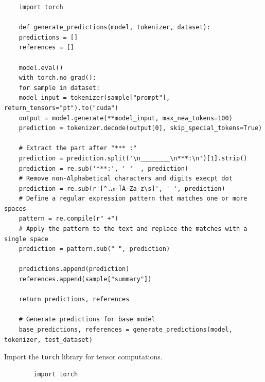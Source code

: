 \documentclass{solutionclass} %
\begin{document}
\begin{lstlisting}
	import torch
	
	def generate_predictions(model, tokenizer, dataset):
	predictions = []
	references = []
	
	model.eval()
	with torch.no_grad():
	for sample in dataset:
	model_input = tokenizer(sample["prompt"], return_tensors="pt").to("cuda")
	output = model.generate(**model_input, max_new_tokens=100)
	prediction = tokenizer.decode(output[0], skip_special_tokens=True)
	
	# Extract the part after "*** :"
	prediction = prediction.split('\n________\n***:\n')[1].strip()
	prediction = re.sub('***:', ' '  , prediction)
	# Remove non-Alphabetical characters and digits execpt dot
	prediction = re.sub(r'[^.آ-یA-Za-z\s]', ' ', prediction)
	# Define a regular expression pattern that matches one or more spaces
	pattern = re.compile(r" +")
	# Apply the pattern to the text and replace the matches with a single space
	prediction = pattern.sub(" ", prediction)
	
	predictions.append(prediction)
	references.append(sample["summary"])
	
	return predictions, references
	
	# Generate predictions for base model
	base_predictions, references = generate_predictions(model, tokenizer, test_dataset)
\end{lstlisting}

\begin{solution}
	Import the \texttt{torch} library for tensor computations.
	\begin{lstlisting}
		import torch
	\end{lstlisting}
\end{solution}
\end{document}
